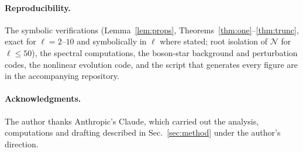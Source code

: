 \documentclass[11pt]{article}
\theoremstyle{remark}
\begin{document}
\paragraph{Reproducibility.} The symbolic verifications (Lemma~\ref{lem:props}, Theorems~\ref{thm:one}--\ref{thm:trunc},
exact for $\ell=2$--$10$ and symbolically in $\ell$ where stated; root isolation of $\mathcal N$ for $\ell\le50$), the
spectral computations, the boson-star background and perturbation codes, the nonlinear evolution code, and the script
that generates every figure are in the accompanying repository.

\paragraph{Acknowledgments.} The author thanks Anthropic's Claude, which carried out the analysis, computations and
drafting described in Sec.~\ref{sec:method} under the author's direction.
\end{document}
